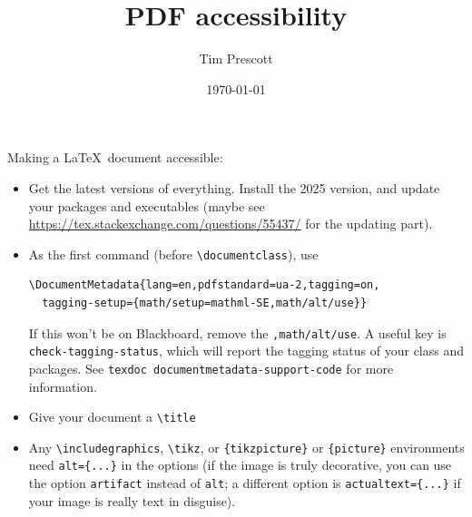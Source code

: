 \documentclass{article}
\title{PDF accessibility}
\date{\today}
\author{Tim Prescott}
\begin{document}
\maketitle\thispagestyle{plain}

Making a \LaTeX\ document accessible:
\begin{itemize}
\item Get the latest versions of everything.  Install the 2025 version, and update your packages and executables (maybe see \url{https://tex.stackexchange.com/questions/55437/} for the updating part).
\item As the first command (before \verb|\documentclass|), use
\begin{verbatim}
\DocumentMetadata{lang=en,pdfstandard=ua-2,tagging=on,
  tagging-setup={math/setup=mathml-SE,math/alt/use}}
\end{verbatim}
If this won't be on Blackboard, remove the \verb|,math/alt/use|.
A useful key is \texttt{check-tagging-status}, which will report the tagging status of your class and packages.
See \texttt{texdoc documentmetadata-support-code} for more information.
\item Give your document a \verb|\title|
\item Any \verb|\includegraphics|, \verb|\tikz|, or \verb|{tikzpicture}| or \verb|{picture}| environments need \verb|alt={...}| in the options (if the image is truly decorative, you can use the option \texttt{artifact} instead of \texttt{alt}; a different option is \verb|actualtext={...}| if your image is really text in disguise).


\end{itemize}
\end{document}
